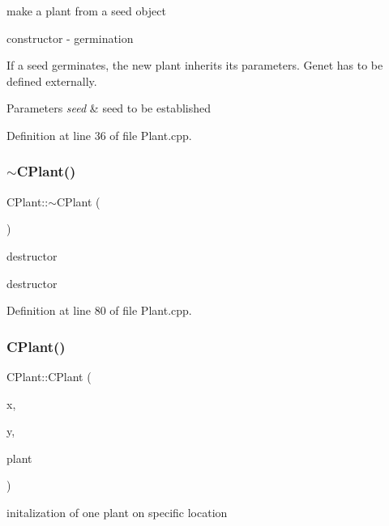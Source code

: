 make a plant from a seed object 

constructor -\/ germination

If a seed germinates, the new plant inherits its parameters. Genet has to be defined externally. 
\begin{DoxyParams}{Parameters}
{\em seed} & seed to be established \\
\hline
\end{DoxyParams}


Definition at line 36 of file Plant.\+cpp.

\mbox{\label{class_c_plant_ad52ea5533d1cefc5db609f1d2754f47f}} 
\subsubsection{\texorpdfstring{$\sim$CPlant()}{~CPlant()}}
{\footnotesize\ttfamily C\+Plant\+::$\sim$\+C\+Plant (\begin{DoxyParamCaption}{ }\end{DoxyParamCaption})\hspace{0.3cm}{\ttfamily [virtual]}}



destructor 

destructor 

Definition at line 80 of file Plant.\+cpp.

\mbox{\label{class_c_plant_ac539d50780b1d39e9426786f9b9917c2}} 
\subsubsection{\texorpdfstring{CPlant()}{CPlant()}\hspace{0.1cm}{\footnotesize\ttfamily [3/3]}}
{\footnotesize\ttfamily C\+Plant\+::\+C\+Plant (\begin{DoxyParamCaption}\item[{double}]{x,  }\item[{double}]{y,  }\item[{\mbox{\hyperlink{class_c_plant}{C\+Plant}} $\ast$}]{plant }\end{DoxyParamCaption})}



initalization of one plant on specific location 

